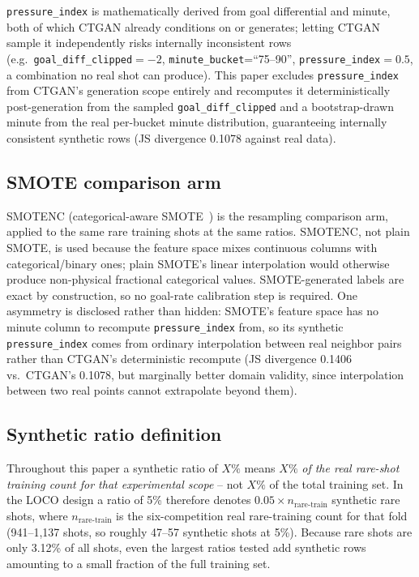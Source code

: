 \documentclass[conference,a4paper]{IEEEtran}
\begin{document}
\texttt{pressure\_index} is mathematically derived from goal differential and minute, both of which CTGAN already conditions on or generates; letting CTGAN sample it independently risks internally inconsistent rows (e.g.\ \texttt{goal\_diff\_clipped}$=-2$, \texttt{minute\_bucket}=``75--90'', \texttt{pressure\_index}$=0.5$, a combination no real shot can produce). This paper excludes \texttt{pressure\_index} from CTGAN's generation scope entirely and recomputes it deterministically post-generation from the sampled \texttt{goal\_diff\_clipped} and a bootstrap-drawn minute from the real per-bucket minute distribution, guaranteeing internally consistent synthetic rows (JS divergence 0.1078 against real data).

\subsection{SMOTE comparison arm}
SMOTENC (categorical-aware SMOTE~\cite{chawla2002smote}) is the resampling comparison arm, applied to the same rare training shots at the same ratios. SMOTENC, not plain SMOTE, is used because the feature space mixes continuous columns with categorical/binary ones; plain SMOTE's linear interpolation would otherwise produce non-physical fractional categorical values. SMOTE-generated labels are exact by construction, so no goal-rate calibration step is required. One asymmetry is disclosed rather than hidden: SMOTE's feature space has no minute column to recompute \texttt{pressure\_index} from, so its synthetic \texttt{pressure\_index} comes from ordinary interpolation between real neighbor pairs rather than CTGAN's deterministic recompute (JS divergence 0.1406 vs.\ CTGAN's 0.1078, but marginally better domain validity, since interpolation between two real points cannot extrapolate beyond them).

\subsection{Synthetic ratio definition}
\label{sec:ratiodef}
Throughout this paper a synthetic ratio of $X\%$ means $X\%$ \emph{of the real rare-shot training count for that experimental scope} -- not $X\%$ of the total training set. In the LOCO design a ratio of 5\% therefore denotes $0.05\times n_{\text{rare-train}}$ synthetic rare shots, where $n_{\text{rare-train}}$ is the six-competition real rare-training count for that fold (941--1,137 shots, so roughly 47--57 synthetic shots at 5\%). Because rare shots are only 3.12\% of all shots, even the largest ratios tested add synthetic rows amounting to a small fraction of the full training set.
\end{document}
